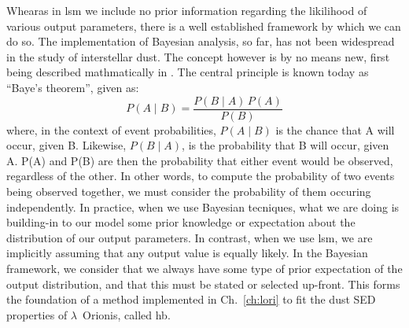        Whearas in \acrshort{lsm} we include no prior information regarding the likilihood of various output parameters, there is a well established framework by which we can do so.  The implementation of Bayesian analysis, so far, has not been widespread in the study of interstellar dust. The concept however is by no means new, first being described mathmatically in \cite{bayes1763}. The central principle is known today as ``Baye's theorem'', given as:
           \begin{equation}
               P(A\mid{} B) = \frac{P(B \mid{} A) \, P(A)}{P(B)}
           \end{equation}
        where, in the context of event probabilities, $P(A\mid{} B)$ is the chance that A will occur, given B. Likewise, $P(B\mid{} A)$, is the probability that B will occur, given A. P(A) and P(B) are then the probability that either event would be observed, regardless of the other. In other words, to compute the probability of two events being observed together, we must consider the probability of them occuring independently. In practice, when we use Bayesian tecniques, what we are doing is building-in to our model some prior knowledge or expectation about the distribution of our output parameters. In contrast, when we use \acrshort{lsm}, we are implicitly assuming that any output value is equally likely. In the Bayesian framework, we consider that we always have some type of prior expectation of the output distribution, and that this must be stated or selected up-front. This forms the foundation of a method implemented in Ch.~\ref{ch:lori} to fit the dust SED properties of $\lambda$~Orionis, called \acrlong{hb}.

